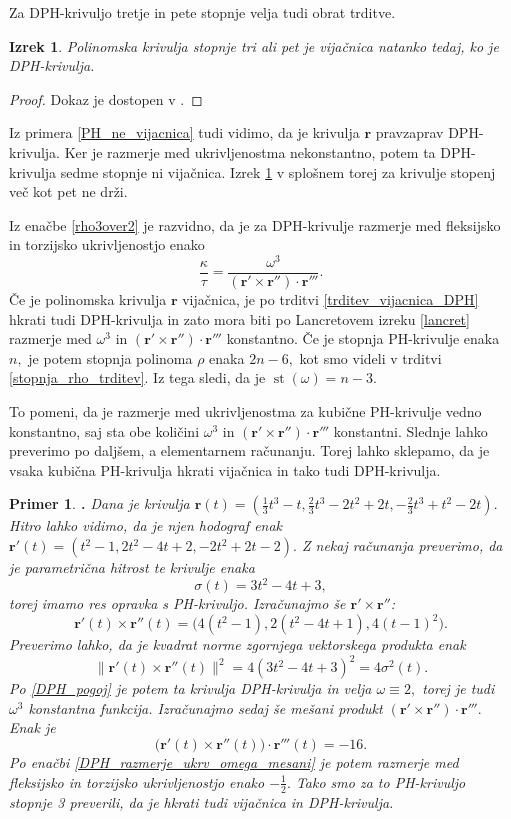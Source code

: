 \documentclass[12pt,a4paper,twoside]{article}
\theoremstyle{definition} %
\theoremstyle{plain} %
\newtheorem{izrek}[definicija]{Izrek}
\theoremstyle{primerstyle}
\newtheorem{primer}[definicija]{Primer}
\numberwithin{equation}{section}  %
\newcommand{\rV}{\mathbf{r}}
\DeclareMathOperator{\st}{st}
\begin{document}
Za DPH-krivuljo tretje in pete stopnje velja tudi obrat trditve.
\begin{izrek}
	\label{DPH_helix_3ali5}
	Polinomska krivulja stopnje tri ali pet je vijačnica natanko tedaj, ko je DPH-krivulja.
\end{izrek}
\begin{proof}
	Dokaz je dostopen v \cite[str.\ 121]{beltranmonterde}.
\end{proof}
Iz primera \ref{PH_ne_vijacnica} tudi vidimo, da je krivulja $\rV$ pravzaprav DPH-krivulja. Ker je razmerje med ukrivljenostma nekonstantno, potem ta DPH-krivulja sedme stopnje ni vijačnica. Izrek \ref{DPH_helix_3ali5} v splošnem torej za krivulje stopenj več kot pet ne drži.

Iz enačbe \eqref{rho3over2} je razvidno, da je za DPH-krivulje razmerje med fleksijsko in torzijsko ukrivljenostjo enako
\begin{equation}
	\label{DPH_razmerje_ukrv_omega_mesani}
	\frac{\kappa}{\tau}=\frac{\omega^3}{(\rV'\times\rV'')\cdot\rV'''}.%
\end{equation}
Če je polinomska krivulja $\rV$ vijačnica, je po trditvi \ref{trditev_vijacnica_DPH} hkrati tudi DPH-krivulja in zato mora biti po Lancretovem izreku \ref{lancret} razmerje med $\omega^3$ in $(\rV'\times\rV'')\cdot\rV'''$ konstantno. Če je stopnja PH-krivulje enaka $n,$ je potem stopnja polinoma $\rho	$ enaka $2n-6,$ kot smo videli v trditvi \ref{stopnja_rho_trditev}. Iz tega sledi, da je $\st(\omega)=n-3.$

To pomeni, da je razmerje med ukrivljenostma za kubične PH-krivulje vedno konstantno, saj sta obe količini $\omega^3$ in $(\rV'\times\rV'')\cdot\rV'''$ konstantni. Slednje lahko preverimo po daljšem, a elementarnem računanju. Torej lahko sklepamo, da je vsaka kubična PH-krivulja hkrati vijačnica in tako tudi DPH-krivulja.
\begin{primer}
	\textbf{.} Dana je krivulja $\rV(t)=(\frac{1}{3}t^3-t,\frac{2}{3}t^3-2t^2+2t,-\frac{2}{3}t^3+t^2-2t).$ Hitro lahko vidimo, da je njen hodograf enak $\rV'(t)=(t^2-1,2t^2-4t+2,-2t^2+2t-2).$ Z nekaj računanja preverimo, da je parametrična hitrost te krivulje enaka
	$$\sigma(t)=3t^2-4t+3,$$
	torej imamo res opravka s PH-krivuljo. Izračunajmo še $\rV'\times\rV''$:
	$$\rV'(t)\times\rV''(t)=\big(4(t^2-1),2(t^2-4t+1),4(t-1)^2\big).$$
	Preverimo lahko, da je kvadrat norme zgornjega vektorskega produkta enak
	$$\lVert\rV'(t)\times\rV''(t)\rVert^2=4(3t^2-4t+3)^2=4\sigma^2(t).$$
	Po \eqref{DPH_pogoj} je potem ta krivulja DPH-krivulja in velja $\omega\equiv2,$ torej je tudi $\omega^3$ konstantna funkcija. Izračunajmo sedaj še mešani produkt $(\rV'\times\rV'')\cdot\rV'''.$ Enak je
	$$\big(\rV'(t)\times\rV''(t)\big)\cdot\rV'''(t)=-16.$$
	Po enačbi \eqref{DPH_razmerje_ukrv_omega_mesani} je potem razmerje med fleksijsko in torzijsko ukrivljenostjo enako $-\frac{1}{2}.$ Tako smo za to PH-krivuljo stopnje 3 preverili, da je hkrati tudi vijačnica in DPH-krivulja.
\end{primer}
\end{document}
